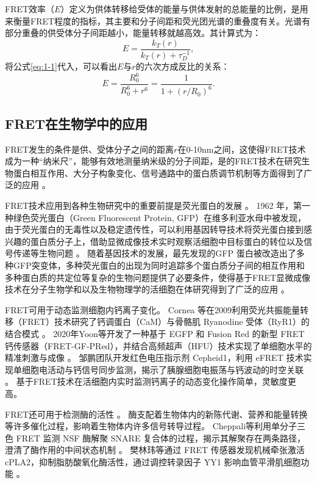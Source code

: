 FRET效率（$E$）定义为供体转移给受体的能量与供体发射的总能量的比例，是用来衡量FRET程度的指标，其主要和分子间距和荧光团光谱的重叠度有关。光谱有部分重叠的供受体分子间距越小，能量转移就越高效。其计算式为：
\begin{equation}
    {E}=\frac{k_T(r)}{k_T(r)+\tau^{-1}_{D}},
\end{equation}
将公式\ref{eq:1-1}代入，可以看出$E$与$r$的六次方成反比的关系：
\begin{equation}
    E=\frac{R_0^6}{R_0^6+r^6}=\frac{1}{1+(r/R_0)^6}.
\end{equation}
\fi

\subsection{FRET在生物学中的应用}

\ifshowtext
FRET发生的条件是供、受体分子之间的距离$r$在0-10nm之间，这使得FRET技术成为一种“纳米尺”，能够有效地测量纳米级的分子间距，是的FRET技术在研究生物蛋白相互作用、大分子构象变化、信号通路中的蛋白质调节机制等方面得到了广泛的应用 。

FRET技术应用到各种生物研究中的重要前提是荧光蛋白的发展 。
1962 年，第一种绿色荧光蛋白（Green Fluorescent Protein, GFP）在维多利亚水母中被发现，由于荧光蛋白的无毒性以及稳定遗传性，可以利用基因转导技术将荧光蛋白接到感兴趣的蛋白质分子上，借助显微成像技术实时观察活细胞中目标蛋白的转位以及信号传递等生物问题 。
随着基因技术的发展，最先发现的GFP 蛋白被改造出了多种GFP突变体，多种荧光蛋白的出现为同时追踪多个蛋白质分子间的相互作用和多种蛋白质的共定位等复杂的生物问题提供了必要条件，使得基于FRET显微成像技术在分子生物学和以及生物物理学的活细胞在体研究得到了广泛的应用 。

FRET可用于动态监测细胞内钙离子变化。
Cornea 等在2009利用荧光共振能量转移（FRET）技术研究了钙调蛋白（CaM）与骨骼肌 Ryanodine 受体（RyR1）的结合模式 。
2020年Yoon等开发了一种基于 EGFP 和 Fusion Red 的新型 FRET 钙传感器（FRET-GF-PRed），并结合高频超声（HFU）技术实现了单细胞水平的精准刺激与成像 。
邹鹏团队开发红色电压指示剂 Cepheid1，利用 eFRET 技术实现单细胞电活动与钙信号同步监测，揭示了胰腺细胞电振荡与钙波动的时空关联 。
基于FRET技术在活细胞内实时监测钙离子的动态变化操作简单，灵敏度更高。

FRET还可用于检测酶的活性 。
酶支配着生物体内的新陈代谢、营养和能量转换等许多催化过程，影响着生物体内许多信号转导过程。
Cheppali等利用单分子三色 FRET 监测 NSF 酶解聚 SNARE 复合体的过程，揭示其解聚存在两条路径，澄清了酶作用的中间状态机制 。
樊林玮等通过 FRET 传感器发现机械牵张激活 cPLA2，抑制脂肪酸氧化酶活性，通过调控转录因子 YY1 影响血管平滑肌细胞功能 。

